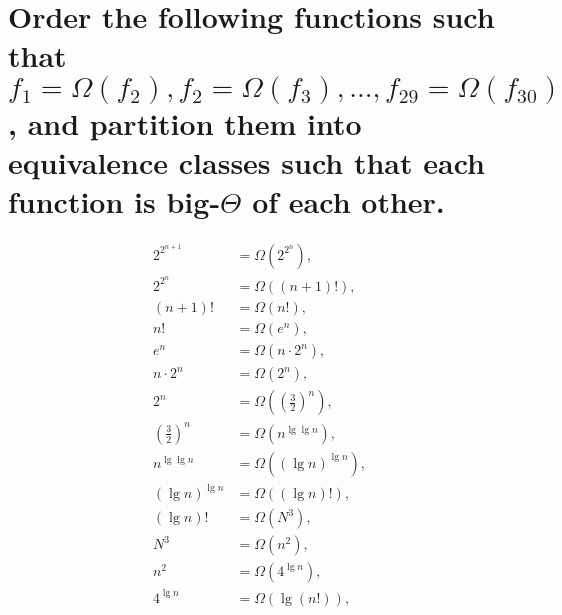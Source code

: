 \section[Problem 6]{Order the following functions such that $f_1 = \Omega(f_2), f_2 = \Omega(f_3), ..., f_{29} = \Omega(f_{30})$, and partition them into equivalence classes such that each function is big-$\Theta$ of each other.}

\begin{align*}
	2^{2^{n + 1}} &= \Omega \left(2^{2^n} \right), \\
	2^{2^n} &= \Omega \left((n + 1)! \right), \\
	(n + 1)! &= \Omega \left(n! \right), \\
	n! &= \Omega \left(e^n \right), \\
	e^n &= \Omega \left(n \cdot 2^n \right), \\
	n \cdot 2^n &= \Omega \left(2^n \right), \\
	2^n &= \Omega \left(\left( \frac{3}{2} \right)^n \right), \\
	\left( \frac{3}{2} \right)^n &= \Omega \left(n^{\lg \lg n} \right), \\
	n^{\lg \lg n} &= \Omega \left(\left( \lg n \right)^{\lg n} \right), \\
	\left( \lg n \right)^{\lg n} &= \Omega \left((\lg n)! \right), \\
	(\lg n)! &= \Omega \left(N^3 \right), \\
	N^3 &= \Omega \left(n^2 \right), \\
	n^2 &= \Omega \left(4^{\lg n} \right), \\
	4^{\lg n} &= \Omega \left(\lg (n!) \right), \\
\end{align*}
